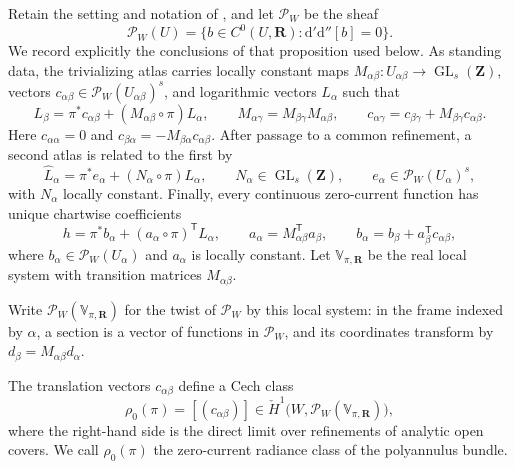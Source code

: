 Retain the setting and notation of
, and let
$\mathscr P_W$ be the sheaf
\[
 \mathscr P_W(U)=
 \{b\in C^0(U,\mathbf R):\mathrm d'\mathrm d''[b]=0\}.
\]
We record explicitly the conclusions of that proposition used below.  As
standing data, the trivializing atlas carries locally constant maps
$M_{\alpha\beta}:U_{\alpha\beta}\to\operatorname{GL}_s(\mathbf Z)$,
vectors $c_{\alpha\beta}\in\mathscr P_W(U_{\alpha\beta})^s$, and logarithmic
vectors $L_\alpha$ such that
\[
 L_\beta=\pi^*c_{\alpha\beta}
 +(M_{\alpha\beta}\circ\pi)L_\alpha,
 \qquad
 M_{\alpha\gamma}=M_{\beta\gamma}M_{\alpha\beta},
 \qquad
 c_{\alpha\gamma}
 =c_{\beta\gamma}+M_{\beta\gamma}c_{\alpha\beta}.
\]
Here $c_{\alpha\alpha}=0$ and
$c_{\beta\alpha}=-M_{\beta\alpha}c_{\alpha\beta}$.  After passage to a
common refinement, a second atlas is related to the first by
\[
 \widehat L_\alpha
 =\pi^*e_\alpha+(N_\alpha\circ\pi)L_\alpha,
 \qquad
 N_\alpha\in\operatorname{GL}_s(\mathbf Z),
 \qquad
 e_\alpha\in\mathscr P_W(U_\alpha)^s,
\]
with $N_\alpha$ locally constant.  Finally, every continuous zero-current
function has unique chartwise coefficients
\[
 h=\pi^*b_\alpha+(a_\alpha\circ\pi)^{\mathsf T}L_\alpha,
 \qquad
 a_\alpha=M_{\alpha\beta}^{\mathsf T}a_\beta,
 \qquad
 b_\alpha=b_\beta+a_\beta^{\mathsf T}c_{\alpha\beta},
\]
where $b_\alpha\in\mathscr P_W(U_\alpha)$ and $a_\alpha$ is locally constant.
Let $\mathbb V_{\pi,\mathbf R}$ be the real local system with transition
matrices $M_{\alpha\beta}$.

\begin{definition}
\label{def:p062-zero-current-radiance-class}
Write $\mathscr P_W(\mathbb V_{\pi,\mathbf R})$ for the twist of
$\mathscr P_W$ by this local system: in the frame indexed by $\alpha$, a
section is a vector of functions in $\mathscr P_W$, and its coordinates
transform by $d_\beta=M_{\alpha\beta}d_\alpha$.

The translation vectors $c_{\alpha\beta}$ define a Cech class
\begin{equation}
\label{eq:p062-zero-current-radiance-class}
 \rho_0(\pi)=[(c_{\alpha\beta})]
 \in
 \check H^1\bigl(W,\mathscr P_W(\mathbb V_{\pi,\mathbf R})\bigr),
\end{equation}
where the right-hand side is the direct limit over refinements of analytic
open covers.  We call $\rho_0(\pi)$ the zero-current radiance class of the
polyannulus bundle.
\end{definition}

